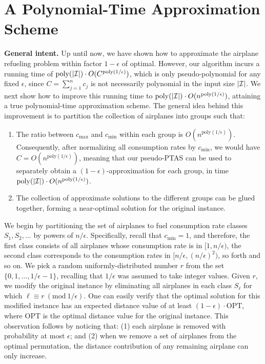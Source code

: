 \documentclass[11pt]{article}
\theoremstyle{plain}
\theoremstyle{definition}
\newcommand{\poly}{\mathrm{poly}}
\newcommand{\opt}{\mathrm{OPT}}
\begin{document}
\section{A Polynomial-Time Approximation Scheme} \label{app:ptas}

{\bf General intent.} Up until now, we have shown how to approximate the airplane refueling problem within factor $1-\epsilon$ of optimal. However, our algorithm incurs a running time of $\poly( |{\cal I}| ) \cdot O( C^{ \poly(1/\epsilon) } )$, which is only pseudo-polynomial for any fixed $\epsilon$, since $C = \sum_{j=1}^n c_{j}$ is not necessarily polynomial in the input size $|\cal I|$. We next show how to improve this running time to $\poly( |{\cal I}| ) \cdot O( n^{ \poly(1/\epsilon) } )$, attaining a true polynomial-time approximation scheme. The general idea behind this improvement is to partition the collection of airplanes into groups such that:
\begin{enumerate}
\item The ratio between $c_{\max}$ and $c_{\min}$ within each group is $O(n^{ \poly(1/\epsilon) } )$. Consequently, after normalizing all consumption rates by $c_{\min}$, we would have $C = O(n^{ \poly(1/\epsilon) } )$, meaning that our pseudo-PTAS can be used to separately obtain a $(1-\epsilon)$-approximation for each group, in time $\poly( |{\cal I}| ) \cdot O( n^{ \poly(1/\epsilon) } )$.

\item The collection of approximate solutions to the different groups can be glued together, forming a near-optimal solution for the original instance.
\end{enumerate}

 We begin by partitioning the set of airplanes to fuel consumption rate classes $S_1, S_2, \ldots$  by powers of $n/\epsilon$. Specifically, recall that $c_{\min} = 1$, and therefore, the first class consists of all airplanes whose consumption rate is in $[1,n/\epsilon)$, the second class corresponds to the consumption rates in $[n/\epsilon,(n/\epsilon)^2)$, so forth and so on. We pick a random uniformly-distributed number $r$ from the set $\{0, 1, \ldots, 1 / \epsilon - 1\}$, recalling that $1 / \epsilon$ was assumed to take integer values. Given $r$, we modify the original instance by eliminating all airplanes in each class $S_\ell$ for which $\ell \equiv r \ (\text{mod}\ 1 / \epsilon)$. One can easily verify that the optimal solution for this modified instance has an expected distance value of at least $(1 - \epsilon) \cdot \opt$, where $\opt$ is the optimal distance value for the original instance. This observation follows by noticing that: (1) each airplane is removed with probability at most $\epsilon$; and (2) when we remove a set of airplanes from the optimal permutation, the distance contribution of any remaining airplane can only increase.
\end{document}
